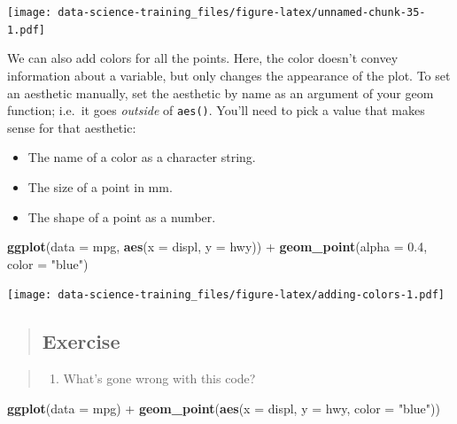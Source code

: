 \documentclass[]{book}
\newenvironment{Shaded}{\begin{snugshade}}{\end{snugshade}}
\newcommand{\KeywordTok}[1]{\textcolor[rgb]{0.13,0.29,0.53}{\textbf{{#1}}}}
\newcommand{\DataTypeTok}[1]{\textcolor[rgb]{0.13,0.29,0.53}{{#1}}}
\newcommand{\FloatTok}[1]{\textcolor[rgb]{0.00,0.00,0.81}{{#1}}}
\newcommand{\StringTok}[1]{\textcolor[rgb]{0.31,0.60,0.02}{{#1}}}
\newcommand{\NormalTok}[1]{{#1}}
\providecommand{\tightlist}{%
  \setlength{\itemsep}{0pt}\setlength{\parskip}{0pt}}
\theoremstyle{definition}
\theoremstyle{definition}
\theoremstyle{definition}
\theoremstyle{remark}
\begin{document}
\texttt{[image: data-science-training\_files/figure-latex/unnamed-chunk-35-1.pdf]}

We can also add colors for all the points. Here, the color doesn't
convey information about a variable, but only changes the appearance of
the plot. To set an aesthetic manually, set the aesthetic by name as an
argument of your geom function; i.e.~it goes \emph{outside} of
\texttt{aes()}. You'll need to pick a value that makes sense for that
aesthetic:

\begin{itemize}
\item
  The name of a color as a character string.
\item
  The size of a point in mm.
\item
  The shape of a point as a number.
\end{itemize}

\begin{Shaded}
\begin{Highlighting}[]
\KeywordTok{ggplot}\NormalTok{(}\DataTypeTok{data =} \NormalTok{mpg, }\KeywordTok{aes}\NormalTok{(}\DataTypeTok{x =} \NormalTok{displ, }\DataTypeTok{y =} \NormalTok{hwy)) +}
\StringTok{    }\KeywordTok{geom_point}\NormalTok{(}\DataTypeTok{alpha =} \FloatTok{0.4}\NormalTok{, }\DataTypeTok{color =} \StringTok{"blue"}\NormalTok{)}
\end{Highlighting}
\end{Shaded}

\texttt{[image: data-science-training\_files/figure-latex/adding-colors-1.pdf]}

\begin{quote}
\subsection{Exercise}\label{exercise-1}
\end{quote}

\begin{quote}
\begin{enumerate}
\def\labelenumi{\arabic{enumi}.}
\tightlist
\item
  What's gone wrong with this code?
\end{enumerate}
\end{quote}

\begin{Shaded}
\begin{Highlighting}[]
    \KeywordTok{ggplot}\NormalTok{(}\DataTypeTok{data =} \NormalTok{mpg) +}\StringTok{ }
\StringTok{      }\KeywordTok{geom_point}\NormalTok{(}\KeywordTok{aes}\NormalTok{(}\DataTypeTok{x =} \NormalTok{displ, }\DataTypeTok{y =} \NormalTok{hwy, }\DataTypeTok{color =} \StringTok{"blue"}\NormalTok{))}
\end{Highlighting}
\end{Shaded}
\end{document}
